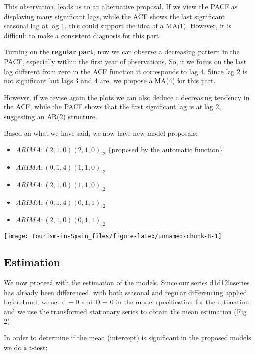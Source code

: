 \documentclass[
]{article}
\providecommand{\tightlist}{%
  \setlength{\itemsep}{0pt}\setlength{\parskip}{0pt}}
\begin{document}
This observation, leads us to an alternative proposal. If we view the
PACF as displaying many significant lags, while the ACF shows the last
significant seasonal lag at lag 1, this could support the idea of a
MA(1). However, it is difficult to make a consistent diagnosis for this
part.

Turning on the \textbf{regular part}, now we can observe a decreasing
pattern in the PACF, especially within the first year of observations.
So, if we focus on the last lag different from zero in the ACF function
it corresponds to lag 4. Since lag 2 is not significant but lags 3 and 4
are, we propose a MA(4) for this part.

However, if we revise again the plots we can also deduce a decreasing
tendency in the ACF, while the PACF shows that the first significant lag
is at lag 2, suggesting an AR(2) structure.

Based on what we have said, we now have new model proposals:

\begin{itemize}
\tightlist
\item
  \(ARIMA: (2, 1, 0)(2, 1, 0)_{12}\) \{proposed by the automatic
  function\}
\item
  \(ARIMA: (0, 1, 4)(1, 1, 0)_{12}\)
\item
  \(ARIMA: (2, 1, 0)(1, 1, 0)_{12}\)
\item
  \(ARIMA: (0, 1, 4)(0, 1, 1)_{12}\)
\item
  \(ARIMA: (2, 1, 0)(0, 1, 1)_{12}\)
\end{itemize}

\begin{center}\texttt{[image: Tourism-in-Spain\_files/figure-latex/unnamed-chunk-8-1]} \end{center}

\hypertarget{estimation}{%
\subsection{Estimation}\label{estimation}}

We now proceed with the estimation of the models. Since our series
d1d12lnseries has already been differenced, with both seasonal and
regular differencing applied beforehand, we set d = 0 and D = 0 in the
model specification for the estimation and we use the transformed
stationary series to obtain the mean estimation (Fig 2)

In order to determine if the mean (intercept) is significant in the
proposed models we do a t-test:
\end{document}
